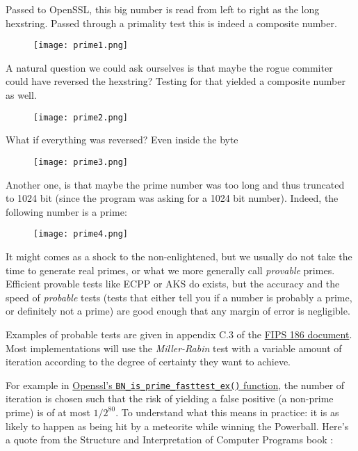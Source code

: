 \documentclass[a4paper,11pt]{article}
\begin{document}
Passed to OpenSSL, this big number is read from left to right as the long hexstring. Passed through a primality test this is indeed a composite number.

\begin{figure}[H]
\centering
\texttt{[image: prime1.png]}
\end{figure}

A natural question we could ask ourselves is that maybe the rogue commiter could have reversed the hexstring? Testing for that yielded a composite number as well.

\begin{figure}[H]
\centering
\texttt{[image: prime2.png]}
\end{figure}

What if everything was reversed? Even inside the byte

\begin{figure}[H]
\centering
\texttt{[image: prime3.png]}
\end{figure}

Another one, is that maybe the prime number was too long and thus truncated to 1024 bit (since the program was asking for a 1024 bit number). Indeed, the following number is a prime:

\begin{figure}[H]
\centering
\texttt{[image: prime4.png]}
\end{figure}

It might comes as a shock to the non-enlightened, but we usually do not take the time to generate real primes, or what we more generally call \emph{provable} primes. Efficient provable tests like ECPP or AKS \cite{ecpp} do exists, but the accuracy and the speed of \emph{probable} tests (tests that either tell you if a number is probably a prime, or definitely not a prime) are good enough that any margin of error is negligible.

Examples of probable tests are given in appendix C.3 of the  \href{http://csrc.nist.gov/publications/fips/fips186-3/fips_186-3.pdf}{FIPS 186 document}. Most implementations will use the \emph{Miller-Rabin} test with a variable amount of iteration according to the degree of certainty they want to achieve.

For example in \href{https://www.openssl.org/docs/manmaster/crypto/BN_generate_prime.html}{Openssl's \texttt{BN_is_prime_fasttest_ex()} function}, the number of iteration is chosen such that the risk of yielding a false positive (a non-prime prime) is of at most $1/2^{80}$. To understand what this means in practice: it is as likely to happen as being hit by a meteorite while winning the Powerball. Here's a quote from the Structure and Interpretation of Computer Programs book \cite{sicp}:
\end{document}
